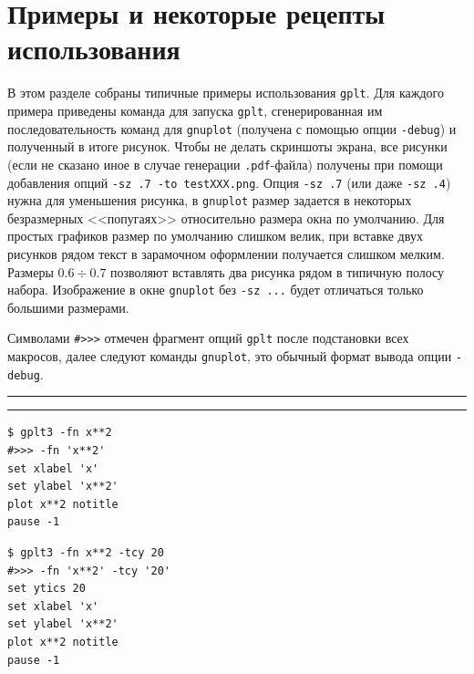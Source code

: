 \documentclass[12pt]{article}
\def\gplt{{\tt gplt}}
\def\gnuplot{{\tt gnuplot}}
\def\pdf{{\tt .pdf}}
\begin{document}
\section{Примеры и некоторые рецепты использования}
\begin{figure}
  \vphantom{.}
  \vspace{-1cm}

\end{figure}
В этом разделе собраны типичные примеры использования \gplt.
Для каждого примера приведены команда для запуска \gplt, сгенерированная им последовательность команд
для \gnuplot{} (получена с помощью опции \verb'-debug') и полученный в итоге рисунок.
Чтобы не делать скриншоты экрана, все рисунки (если не сказано иное в случае генерации \pdf-файла) получены при помощи добавления
опций \verb'-sz .7 -to testXXX.png'. Опция \verb'-sz .7' (или даже \verb'-sz .4') нужна для уменьшения рисунка,
в \gnuplot{} размер задается в некоторых безразмерных <<попугаях>> относительно размера окна по умолчанию.
Для простых графиков размер по умолчанию слишком велик, при вставке двух рисунков рядом текст
в зарамочном оформлении получается слишком мелким. Размеры $0.6\div0.7$ позволяют вставлять два рисунка рядом в типичную полосу набора. 
Изображение в окне \gnuplot{} без \verb'-sz ...' будет отличаться только большими размерами.

Символами \verb'#>>>' отмечен фрагмент опций \gplt{} после подстановки всех макросов, далее следуют команды \gnuplot,
это обычный формат вывода опции \verb'-debug'.\\

\noindent\rule{.45\textwidth}{1pt}\hfill {}  \hfill\rule{.45\textwidth}{1pt}

\vspace{3mm}
\noindent
\begin{minipage}[b]{0.19\textwidth}\small
\begin{verbatim}
$ gplt3 -fn x**2 
#>>> -fn 'x**2'
set xlabel 'x'
set ylabel 'x**2'
plot x**2 notitle   
pause -1
\end{verbatim}
\end{minipage}
\hfill
\begin{minipage}[b]{0.27\textwidth}\small
\begin{verbatim}
$ gplt3 -fn x**2 -tcy 20
#>>> -fn 'x**2' -tcy '20'
set ytics 20
set xlabel 'x'
set ylabel 'x**2'
plot x**2 notitle   
pause -1
\end{verbatim}
\end{minipage}
\end{document}
